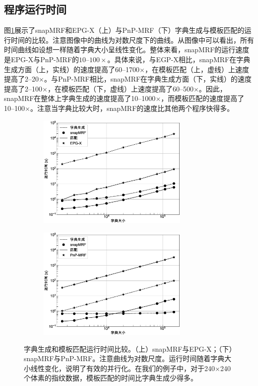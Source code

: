\subsection{程序运行时间}
图\ref{fig:time}展示了snapMRF和EPG-X（上）与PnP-MRF（下）字典生成与模板匹配的运行时间的比较。注意图像中的曲线为对数尺度下的曲线。从图像中可以看出，所有时间曲线如设想一样随着字典大小呈线性变化。整体来看，snapMRF的运行速度是EPG-X与PnP-MRF的$10$--$100 \times$。具体来说，与EGP-X相比，snapMRF在字典生成方面（上，实线）的速度提高了60--1700$\times$，在模板匹配（上，虚线）上速度提高了2--20$\times$。与PnP-MRF相比，snapMRF在字典生成方面（下，实线）的速度提高了2--100$\times$，在模板匹配（下，虚线）上速度提高了60--500$\times$。因此，snapMRF在整体上字典生成的速度提高了10--1000$\times$，而模板匹配的速度提高了10--100$\times$。注意当字典比较大时，snapMRF的速度比其他两个程序快得多。

\begin{figure}
\centering
\begin{subfigure}
 \centering
 \includegraphics[width=0.8\textwidth]{img/snapmrf/time_vs_epgx.eps}
\end{subfigure}
\begin{subfigure}
 \centering
 \includegraphics[width=0.8\textwidth]{img/snapmrf/time_vs_pnp.eps}
\end{subfigure}
\caption{字典生成和模板匹配运行时间比较。（上）snapMRF与EPG-X；（下）snapMRF与PnP-MRF。注意曲线为对数尺度。运行时间随着字典大小线性变化，说明了有效的并行化。在我们的例子中，对于240$\times$240个体素的指纹数据，模板匹配的时间比字典生成少得多。}
\label{fig:time}
\end{figure}

